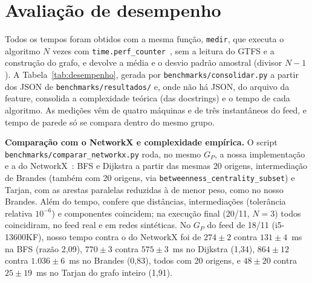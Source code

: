 \section{Avaliação de desempenho}\label{sec:avaliacao}

Todos os tempos foram obtidos com a mesma função, \texttt{medir}, que executa o algoritmo $N$
vezes com \texttt{time.perf\_counter}~\cite{python-perf-counter}, sem a leitura do GTFS e a
construção do grafo, e devolve a média e o desvio padrão amostral (divisor $N - 1$). A Tabela~\ref{tab:desempenho}, gerada por
\texttt{benchmarks/consolidar.py} a partir dos JSON de \texttt{benchmarks/resultados/} e, onde não
há JSON, do arquivo da feature, consolida a complexidade teórica (das docstrings) e o tempo de
cada algoritmo. As medições vêm de quatro máquinas e de três instantâneos do feed, e
tempo de parede só se compara dentro do mesmo grupo.



\textbf{Comparação com o NetworkX e complexidade empírica.} O script
\texttt{benchmarks/comparar\_networkx.py} roda, no mesmo $G_P$, a nossa implementação e a do
NetworkX~\cite{hagberg2008}: BFS e Dijkstra a partir das mesmas 20 origens, intermediação de
Brandes (também com 20 origens, via \texttt{betweenness\_centrality\_subset}) e Tarjan, com as
arestas paralelas reduzidas à de menor peso, como no nosso Brandes. Além do tempo, confere que
distâncias, intermediações (tolerância relativa $10^{-6}$) e componentes coincidem; na execução
final (20/11, $N = 3$) todos coincidiram, no feed real e em redes sintéticas. No $G_P$ do feed
de 18/11 (i5-13600KF), nosso tempo contra o do NetworkX foi de $274 \pm 2$ contra $131 \pm 4$~ms
na BFS (razão 2,09), $770 \pm 3$ contra $575 \pm 3$~ms no Dijkstra (1,34), $864 \pm 12$ contra
$1{.}036 \pm 6$~ms no Brandes (0,83), todos com 20 origens, e $48 \pm 20$ contra $25 \pm 19$~ms
no Tarjan do grafo inteiro (1,91).

